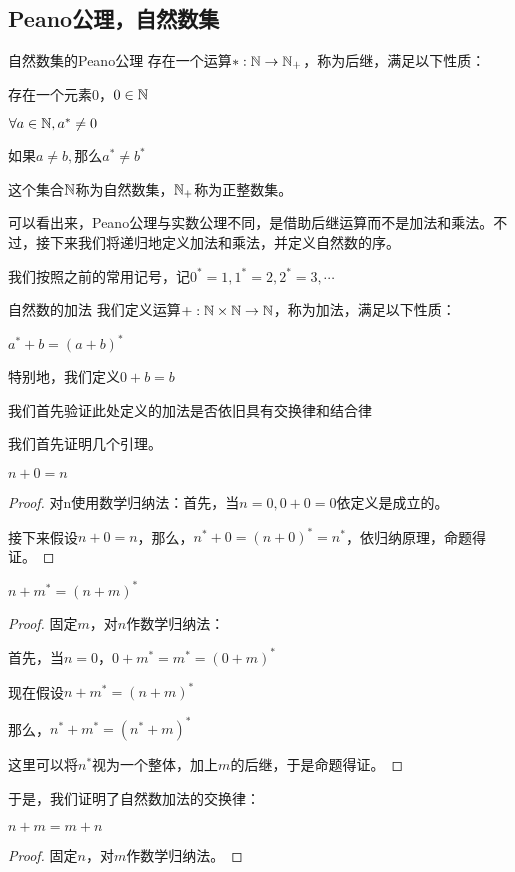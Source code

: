 \documentclass[12pt, a4paper, oneside, UTF8]{ctexbook}
\begin{document}
		\subsection{Peano公理，自然数集}
			\begin{para}{0}
					\begin{defn}{自然数集的Peano公理}{}
						存在一个运算$*:\mathbb{N} \rightarrow \mathbb{N}_+$，称为后继，满足以下性质：
						
						 存在一个元素$0$，$0 \in \mathbb{N}$
						
						 $\forall a \in \mathbb{N} ,a^* \neq 0$
						
						 如果$a \neq b,$那么$a^* \neq b^*$
						
						这个集合$\mathbb{N}$称为自然数集，$\mathbb{N}_+$称为正整数集。
					\end{defn}
					可以看出来，Peano公理与实数公理不同，是借助后继运算而不是加法和乘法。不过，接下来我们将递归地定义加法和乘法，并定义自然数的序。
					
					我们按照之前的常用记号，记$0^*=1,1^*=2,2^*=3,\cdots$
					\begin{defn}{自然数的加法}{}
						我们定义运算$+:\mathbb{N} \times \mathbb{N} \rightarrow \mathbb{N}$，称为加法，满足以下性质：
						
						$a^*+b=(a+b)^*$
						
						特别地，我们定义$0+b=b$
					\end{defn}
					我们首先验证此处定义的加法是否依旧具有交换律和结合律
					
					我们首先证明几个引理。
					\begin{lemma}{}{}
						$n+0=n$
					\end{lemma}
					\begin{proof}
						对n使用数学归纳法：首先，当$n=0,0+0=0$依定义是成立的。
						
						接下来假设$n+0=n$，那么，$n^*+0=(n+0)^*=n^*$，依归纳原理，命题得证。
					\end{proof}
					\begin{lemma}{}{}
						$n+m^{*}=(n+m)^{*}$
					\end{lemma}
					\begin{proof}
						固定$m$，对$n$作数学归纳法：
						
						首先，当$n=0$，$0+m^*=m^*=(0+m)^*$
						
						现在假设$n+m^*=(n+m)^*$
						
						那么，$n^*+m^*=\left(n^*+m\right)^*$
						
						这里可以将$n^*$视为一个整体，加上$m$的后继，于是命题得证。
					\end{proof}
					于是，我们证明了自然数加法的交换律：
					\begin{proposition}
						$n+m=m+n$
					\end{proposition}
					\begin{proof}
						固定$n$，对$m$作数学归纳法。
						

\end{proof}
\end{para}
\end{document}
